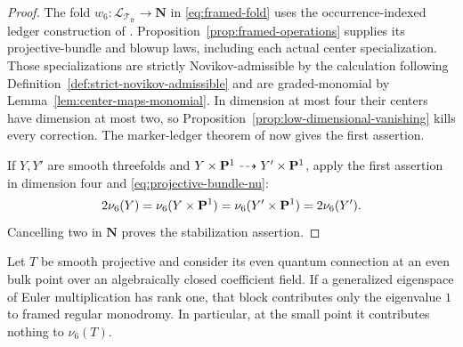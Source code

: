 \begin{proof}
The fold \(w_6:\mathcal L_{\mathcal T_{\mathrm{fr}}}\to\mathbf N\) in
\eqref{eq:framed-fold} uses the occurrence-indexed ledger construction of
\cite{RuddM1}.  Proposition~\ref{prop:framed-operations}
supplies its projective-bundle and blowup laws, including each actual center
specialization.  Those specializations are strictly Novikov-admissible by the
calculation following Definition~\ref{def:strict-novikov-admissible} and are
graded-monomial by Lemma~\ref{lem:center-maps-monomial}.  In dimension at
most four their centers have dimension at most two, so
Proposition~\ref{prop:low-dimensional-vanishing} kills every correction.
The marker-ledger theorem of \cite{RuddM1} now gives the first assertion.

If \(Y,Y'\) are smooth threefolds and
\(Y\times\mathbf P^1\dashrightarrow Y'\times\mathbf P^1\), apply the first assertion in
dimension four and \eqref{eq:projective-bundle-nu}:
\[
 2\nu_6(Y)=\nu_6(Y\times\mathbf P^1)
 =\nu_6(Y'\times\mathbf P^1)=2\nu_6(Y').
\]
Cancelling two in \(\mathbf N\) proves the stabilization assertion.
\end{proof}

\begin{lemma}\label{lem:simple-euler-block}
%
%
Let $T$ be smooth projective and consider its even quantum connection at an
even bulk point over an algebraically closed coefficient field.  If a
generalized eigenspace of Euler multiplication has rank one, that block
contributes only the eigenvalue $1$ to framed regular monodromy.  In
particular, at the small point it contributes nothing to $\nu_6(T)$.
\end{lemma}

